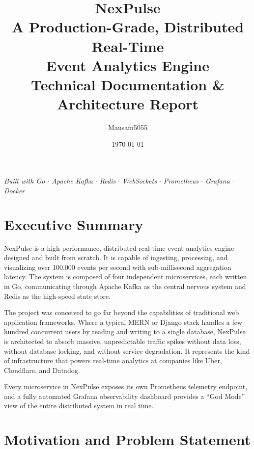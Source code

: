\documentclass[12pt,a4paper]{article}
\title{
    \vspace{-1cm}
    {\Huge\textbf{NexPulse}}\\[0.3cm]
    {\Large A Production-Grade, Distributed Real-Time\\Event Analytics Engine}\\[0.5cm]
    {\large Technical Documentation \& Architecture Report}
}
\author{Mausam5055}
\date{\today}
\begin{document}
\maketitle
\thispagestyle{empty}

\vspace{1cm}
\begin{center}
\textit{Built with Go $\cdot$ Apache Kafka $\cdot$ Redis $\cdot$ WebSockets $\cdot$ Prometheus $\cdot$ Grafana $\cdot$ Docker}
\end{center}

\newpage
\tableofcontents
\newpage

\section{Executive Summary}

NexPulse is a high-performance, distributed real-time event analytics engine designed and built from scratch. It is capable of ingesting, processing, and visualizing over 100,000 events per second with sub-millisecond aggregation latency. The system is composed of four independent microservices, each written in Go, communicating through Apache Kafka as the central nervous system and Redis as the high-speed state store.

The project was conceived to go far beyond the capabilities of traditional web application frameworks. Where a typical MERN or Django stack handles a few hundred concurrent users by reading and writing to a single database, NexPulse is architected to absorb massive, unpredictable traffic spikes without data loss, without database locking, and without service degradation. It represents the kind of infrastructure that powers real-time analytics at companies like Uber, Cloudflare, and Datadog.

Every microservice in NexPulse exposes its own Prometheus telemetry endpoint, and a fully automated Grafana observability dashboard provides a ``God Mode'' view of the entire distributed system in real time.

\section{Motivation and Problem Statement}
\end{document}
